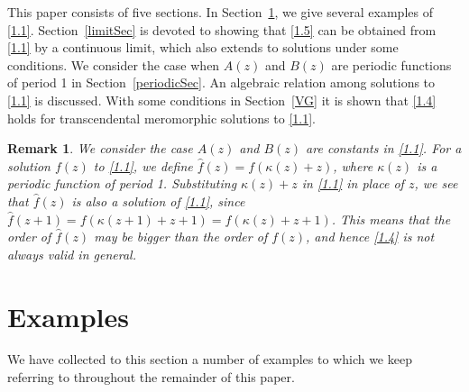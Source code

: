\documentclass{amsart}
\newtheorem{remark}[theorem]{Remark}
\begin{document}
This paper consists of five sections.
In Section~\ref{examplesSec}, we give several examples of \eqref{1.1}.
Section~\ref{limitSec} is devoted to showing that \eqref{1.5} can be obtained from \eqref{1.1} by a continuous limit, which also extends to solutions under some conditions.
We consider the case when $A(z)$ and $B(z)$ are periodic functions of period 1 in Section~\ref{periodicSec}.
An algebraic relation among solutions to \eqref{1.1} is discussed.
With some conditions in Section~\ref{VG} it is shown that \eqref{1.4} holds for transcendental meromorphic solutions to \eqref{1.1}.


\begin{remark}\label{rem1.1}
We consider the case $A(z)$ and $B(z)$ are constants in \eqref{1.1}.
For a solution $f(z)$ to \eqref{1.1}, we define $\hat{f}(z)=f(\kappa(z)+z)$, where $\kappa(z)$ is a periodic function of period 1.
Substituting $\kappa(z)+z$ in \eqref{1.1} in place of $z$, we see that $\hat{f}(z)$ is also
a solution of \eqref{1.1}, since $\hat{f}(z+1)=f(\kappa(z+1)+z+1)=f(\kappa(z)+z+1)$.
This means that the order of $\hat{f}(z)$ may be bigger than the order of $f(z)$,
and hence \eqref{1.4} is not always valid in general.
\end{remark}


\section{Examples}\label{examplesSec}

We have collected to this section a number of examples to which we keep referring to throughout the remainder of this paper.
\end{document}
